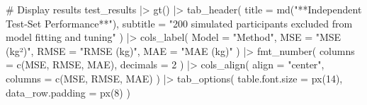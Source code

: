 \documentclass[
  letterpaper,
  DIV=11,
  numbers=noendperiod]{scrreprt}
\newenvironment{Shaded}{\begin{snugshade}}{\end{snugshade}}
\newcommand{\AttributeTok}[1]{\textcolor[rgb]{0.40,0.45,0.13}{#1}}
\newcommand{\CommentTok}[1]{\textcolor[rgb]{0.37,0.37,0.37}{#1}}
\newcommand{\DecValTok}[1]{\textcolor[rgb]{0.68,0.00,0.00}{#1}}
\newcommand{\FunctionTok}[1]{\textcolor[rgb]{0.28,0.35,0.67}{#1}}
\newcommand{\NormalTok}[1]{\textcolor[rgb]{0.00,0.23,0.31}{#1}}
\newcommand{\SpecialCharTok}[1]{\textcolor[rgb]{0.37,0.37,0.37}{#1}}
\newcommand{\StringTok}[1]{\textcolor[rgb]{0.13,0.47,0.30}{#1}}
\begin{document}
\begin{Shaded}
\begin{Highlighting}[]
\CommentTok{\# Display results}
\NormalTok{test\_results }\SpecialCharTok{|\textgreater{}}
  \FunctionTok{gt}\NormalTok{() }\SpecialCharTok{|\textgreater{}}
  \FunctionTok{tab\_header}\NormalTok{(}
    \AttributeTok{title =} \FunctionTok{md}\NormalTok{(}\StringTok{"**Independent Test{-}Set Performance**"}\NormalTok{),}
    \AttributeTok{subtitle =} \StringTok{"200 simulated participants excluded from model fitting and tuning"}
\NormalTok{  ) }\SpecialCharTok{|\textgreater{}}
  \FunctionTok{cols\_label}\NormalTok{(}
    \AttributeTok{Model =} \StringTok{"Method"}\NormalTok{,}
    \AttributeTok{MSE =} \StringTok{"MSE (kg²)"}\NormalTok{,}
    \AttributeTok{RMSE =} \StringTok{"RMSE (kg)"}\NormalTok{,}
    \AttributeTok{MAE =} \StringTok{"MAE (kg)"}
\NormalTok{  ) }\SpecialCharTok{|\textgreater{}}
  \FunctionTok{fmt\_number}\NormalTok{(}
    \AttributeTok{columns =} \FunctionTok{c}\NormalTok{(MSE, RMSE, MAE),}
    \AttributeTok{decimals =} \DecValTok{2}
\NormalTok{  ) }\SpecialCharTok{|\textgreater{}}
  \FunctionTok{cols\_align}\NormalTok{(}
    \AttributeTok{align =} \StringTok{"center"}\NormalTok{,}
    \AttributeTok{columns =} \FunctionTok{c}\NormalTok{(MSE, RMSE, MAE)}
\NormalTok{  ) }\SpecialCharTok{|\textgreater{}}
  \FunctionTok{tab\_options}\NormalTok{(}
    \AttributeTok{table.font.size =} \FunctionTok{px}\NormalTok{(}\DecValTok{14}\NormalTok{),}
    \AttributeTok{data\_row.padding =} \FunctionTok{px}\NormalTok{(}\DecValTok{8}\NormalTok{)}
\NormalTok{  )}
\end{Highlighting}
\end{Shaded}

\begin{table}

\caption{\label{tbl-test-performance}}


\end{table}%
\end{document}
